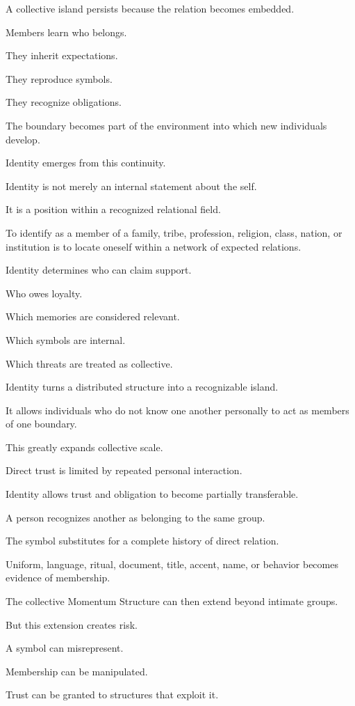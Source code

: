 A collective island persists because the relation becomes embedded.

Members learn who belongs.

They inherit expectations.

They reproduce symbols.

They recognize obligations.

The boundary becomes part of the environment into which new individuals develop.

Identity emerges from this continuity.

Identity is not merely an internal statement about the self.

It is a position within a recognized relational field.

To identify as a member of a family, tribe, profession, religion, class, nation, or institution is to locate oneself within a network of expected relations.

Identity determines who can claim support.

Who owes loyalty.

Which memories are considered relevant.

Which symbols are internal.

Which threats are treated as collective.

Identity turns a distributed structure into a recognizable island.

It allows individuals who do not know one another personally to act as members of one boundary.

This greatly expands collective scale.

Direct trust is limited by repeated personal interaction.

Identity allows trust and obligation to become partially transferable.

A person recognizes another as belonging to the same group.

The symbol substitutes for a complete history of direct relation.

Uniform, language, ritual, document, title, accent, name, or behavior becomes evidence of membership.

The collective Momentum Structure can then extend beyond intimate groups.

But this extension creates risk.

A symbol can misrepresent.

Membership can be manipulated.

Trust can be granted to structures that exploit it.

